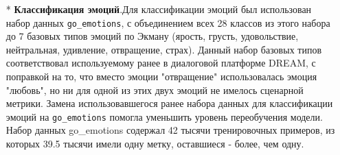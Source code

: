 \begin{itemize}
\item[*]\textbf{Классификация эмоций}.Для классификации эмоций был использован набор данных \texttt{go\_emotions}\cite{go_emotions}, с объединением всех 28 классов из этого набора до 7 базовых типов эмоций по Экману (ярость, грусть, удовольствие, нейтральная, удивление, отвращение, страх). Данный набор базовых типов соответствовал используемому ранее в диалоговой платформе DREAM, с поправкой на то, что вместо эмоции "отвращение" использовалась эмоция "любовь", но ни для одной из этих двух эмоций не имелось сценарной метрики. Замена использовавшегося ранее набора данных для классификации эмоций на \texttt{go\_emotions} помогла уменьшить уровень переобучения модели. 
 Набор данных go\_emotions содержал 42 тысячи тренировочных примеров, из которых 39.5 тысячи имели одну метку, оставшиеся - более, чем одну. 


\end{itemize}
